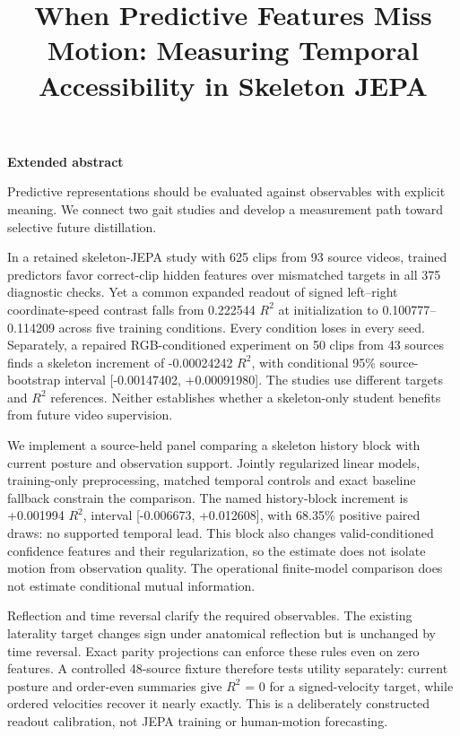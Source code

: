 \documentclass{article}
\title{When Predictive Features Miss Motion: Measuring Temporal Accessibility in Skeleton JEPA}
\begin{document}
\maketitle
\begin{center}\textbf{Extended abstract}\end{center}
Predictive representations should be evaluated against observables with explicit meaning. We connect two gait studies and develop a measurement path toward selective future distillation.

In a retained skeleton-JEPA study with 625 clips from 93 source videos, trained predictors favor correct-clip hidden features over mismatched targets in all 375 diagnostic checks. Yet a common expanded readout of signed left--right coordinate-speed contrast falls from 0.222544 \(R^2\) at initialization to 0.100777--0.114209 across five training conditions. Every condition loses in every seed. Separately, a repaired RGB-conditioned experiment on 50 clips from 43 sources finds a skeleton increment of -0.00024242 \(R^2\), with conditional 95\% source-bootstrap interval {[}-0.00147402, +0.00091980{]}. The studies use different targets and \(R^2\) references. Neither establishes whether a skeleton-only student benefits from future video supervision.

We implement a source-held panel comparing a skeleton history block with current posture and observation support. Jointly regularized linear models, training-only preprocessing, matched temporal controls and exact baseline fallback constrain the comparison. The named history-block increment is +0.001994 \(R^2\), interval {[}-0.006673, +0.012608{]}, with 68.35\% positive paired draws: no supported temporal lead. This block also changes valid-conditioned confidence features and their regularization, so the estimate does not isolate motion from observation quality. The operational finite-model comparison does not estimate conditional mutual information.

Reflection and time reversal clarify the required observables. The existing laterality target changes sign under anatomical reflection but is unchanged by time reversal. Exact parity projections can enforce these rules even on zero features. A controlled 48-source fixture therefore tests utility separately: current posture and order-even summaries give \(R^2\) = 0 for a signed-velocity target, while ordered velocities recover it nearly exactly. This is a deliberately constructed readout calibration, not JEPA training or human-motion forecasting.
\end{document}
